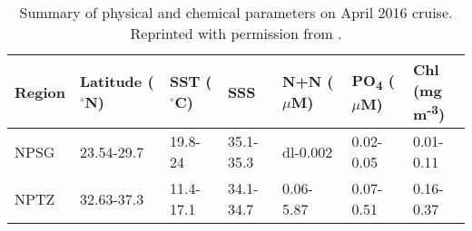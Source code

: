 \begin{table}[ht]
\centering
\begin{tabular}{lllllll}
  \hline
Region & \makecell{Latitude \\ ($^\circ$N)} & \makecell{SST \\ ($^\circ$C)} & SSS & \makecell{N+N \\ ($\mu$M)} & \makecell{PO\textsubscript{4} \\ ($\mu$M)} & \makecell{Chl \\ (mg m\textsuperscript{-3})} \\ 
  \hline
NPSG & 23.54-29.7 & 19.8-24 & 35.1-35.3 & dl-0.002 & 0.02-0.05 & 0.01-0.11 \\ 
  NPTZ & 32.63-37.3 & 11.4-17.1 & 34.1-34.7 & 0.06-5.87 & 0.07-0.51 & 0.16-0.37 \\ 
   \hline
\end{tabular}
\caption{\label{ZoneDescriptions} Summary of physical and chemical parameters on April 2016 cruise.  Reprinted with permission from \cite{Gradoville2020}.} 
\end{table}
